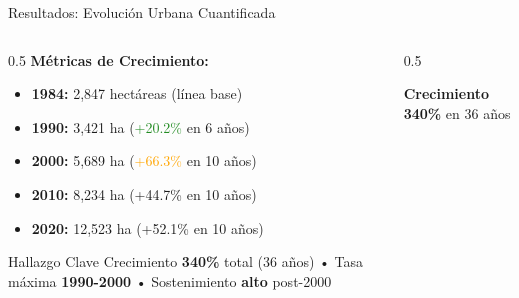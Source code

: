 \documentclass[aspectratio=169]{beamer}
\begin{document}
\begin{frame}{Resultados: Evolución Urbana Cuantificada}
  \begin{columns}
    \begin{column}{0.5\textwidth}
      \textbf{Métricas de Crecimiento:}
      \begin{itemize}
        \item \textbf{1984:} 2,847 hectáreas (línea base)
        \item \textbf{1990:} 3,421 ha (\textcolor{ForestGreen}{+20.2\%} en 6 años)
        \item \textbf{2000:} 5,689 ha (\textcolor{Orange}{+66.3\%} en 10 años)
        \item \textbf{2010:} 8,234 ha (\textcolor{UNAMBlue}{+44.7\%} en 10 años)  
  \item \textbf{2020:} 12,523 ha (\textcolor{UNAMRed}{+52.1\%} en 10 años)
      \end{itemize}
      
      \vspace{0.3cm}
      \begin{exampleblock}{Hallazgo Clave}
      \small Crecimiento \textbf{340\%} total (36 años) • 
      Tasa máxima \textbf{1990-2000} • 
      Sostenimiento \textbf{alto} post-2000
      \end{exampleblock}
    \end{column}
    \begin{column}{0.5\textwidth}
      \begin{center}
      \end{center}
      \vspace{0.2cm}
      {\small \textbf{Crecimiento 340\%} en 36 años}
    \end{column}
  \end{columns}
\end{frame}
\end{document}
